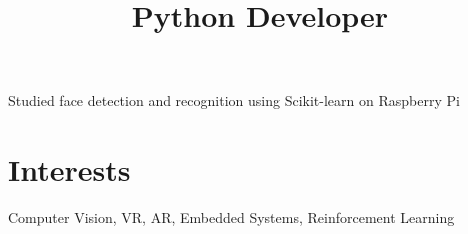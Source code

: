 \documentclass[margin]{res}
\begin{document}
\begin{resume}
      \title{\textbf{Python Developer}}
      \begin{position}
        Studied face detection and recognition using Scikit-learn on Raspberry Pi
      \end{position}

    \section{Interests}
      Computer Vision, VR, AR, Embedded Systems, Reinforcement Learning
  \end{resume}
\end{document}
